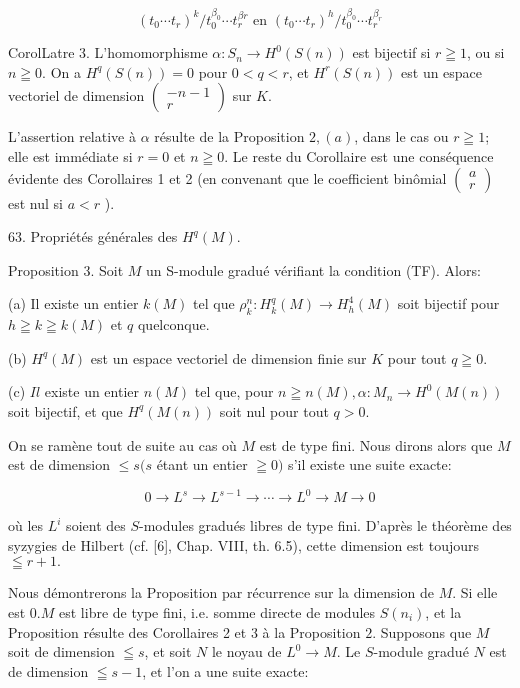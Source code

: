 $$
\left(t_{0} \cdots t_{r}\right)^{k} / t_{0}^{\beta_{0}} \cdots t_{r}^{\beta r} \text { en }\left(t_{0} \cdots t_{r}\right)^{h} / t_{0}^{\beta_{0}} \cdots t_{r}^{\beta_{r}}
$$

CorolLatre 3. L'homomorphisme $\alpha: S_{n} \rightarrow H^{0}(S(n))$ est bijectif si $r \geqq 1$, ou si $n \geqq 0 .$ On a $H^{q}(S(n))=0$ pour $0<q<r$, et $H^{r}(S(n))$ est un espace vectoriel de dimension $\left(\begin{array}{c}-n-1 \\ r\end{array}\right)$ sur $K$.

L'assertion relative à $\alpha$ résulte de la Proposition $2,(a)$, dans le cas ou $r \geqq 1$; elle est immédiate si $r=0$ et $n \geqq 0$. Le reste du Corollaire est une conséquence évidente des Corollaires 1 et 2 (en convenant que le coefficient binômial $\left(\begin{array}{l}a \\ r\end{array}\right)$ est nul si $a<r$ ).

63. Propriétés générales des $H^{q}(M)$.

Proposition $3 .$ Soit $M$ un S-module gradué vérifiant la condition (TF). Alors:

(a) Il existe un entier $k(M)$ tel que $\rho_{k}^{n}: H_{k}^{q}(M) \rightarrow H_{h}^{4}(M)$ soit bijectif pour $h \geqq k \geqq k(M)$ et $q$ quelconque.

(b) $H^{q}(M)$ est un espace vectoriel de dimension finie sur $K$ pour tout $q \geqq 0$.

(c) $I l$ existe un entier $n(M)$ tel que, pour $n \geqq n(M), \alpha: M_{n} \rightarrow H^{0}(M(n))$ soit bijectif, et que $H^{q}(M(n))$ soit nul pour tout $q>0$.

On se ramène tout de suite au cas où $M$ est de type fini. Nous dirons alors que $M$ est de dimension $\leq s(s$ étant un entier $\geqq 0)$ s'il existe une suite exacte:

$$
0 \rightarrow L^{s} \rightarrow L^{s-1} \rightarrow \cdots \rightarrow L^{0} \rightarrow M \rightarrow 0
$$

où les $L^{i}$ soient des $S$-modules gradués libres de type fini. D'après le théorème des syzygies de Hilbert (cf. [6], Chap. VIII, th. 6.5), cette dimension est toujours $\leqq r+1 .$

Nous démontrerons la Proposition par récurrence sur la dimension de $M$. Si elle est $0 . M$ est libre de type fini, i.e. somme directe de modules $S\left(n_{i}\right)$, et la Proposition résulte des Corollaires 2 et 3 à la Proposition $2 .$ Supposons que $M$ soit de dimension $\leqq s$, et soit $N$ le noyau de $L^{0} \rightarrow M$. Le $S$-module gradué $N$ est de dimension $\leqq s-1$, et l'on a une suite exacte:


